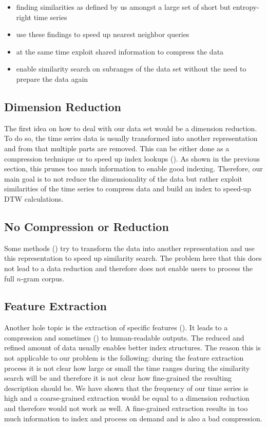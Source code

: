 \begin{itemize}
    \item finding similarities as defined by us amongst a large set of short but entropy-right time series
    \item use these findings to speed up nearest neighbor queries
    \item at the same time exploit shared information to compress the data
    \item enable similarity search on subranges of the data set without the need to prepare the data again
\end{itemize}


\subsection{Dimension Reduction}
\label{ssec:baseline:prior:dimred}

The first idea on how to deal with our data set would be a dimension reduction. To do so, the time series data is usually transformed into another representation and from that multiple parts are removed. This can be either done as a compression technique or to speed up index lookups (\cite{LB_Keogh,LB_Improved,dimred1,dimred2}). As shown in the previous section, this prunes too much information to enable good indexing. Therefore, our main goal is to not reduce the dimensionality of the data but rather exploit similarities of the time series to compress data and build an index to speed-up DTW calculations.


\subsection{No Compression or Reduction}
\label{ssec:baseline:prior:nocompression}

Some methods (\cite{dimred3,dimred4}) try to transform the data into another representation and use this representation to speed up similarity search. The problem here that this does not lead to a data reduction and therefore does not enable users to process the full $n$-gram corpus.


\subsection{Feature Extraction}
\label{ssec:baseline:prior:extract}

Another hole topic is the extraction of specific features (\cite{compress1,compress2,compress3,compress4,compress5}). It leads to a compression and sometimes (\cite{compress1}) to human-readable outputs. The reduced and refined amount of data usually enables better index structures. The reason this is not applicable to our problem is the following: during the feature extraction process it is not clear how large or small the time ranges during the similarity search will be and therefore it is not clear how fine-grained the resulting description should be. We have shown that the frequency of our time series is high and a coarse-grained extraction would be equal to a dimension reduction and therefore would not work as well. A fine-grained extraction results in too much information to index and process on demand and is also a bad compression.


